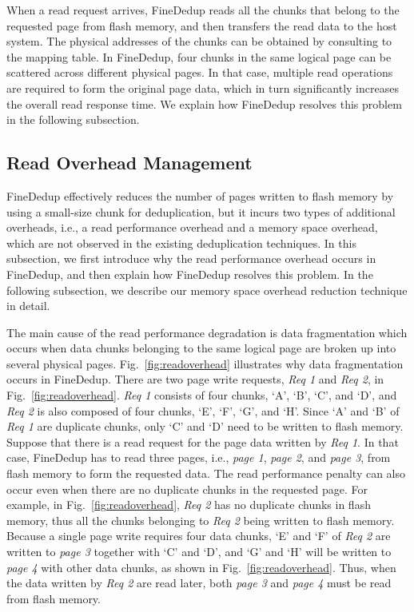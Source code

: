 When a read request arrives,
FineDedup reads all the chunks that belong to the requested page from flash memory,
and then transfers the read data to the host system.
The physical addresses of the chunks can be obtained by consulting to the mapping table.
In FineDedup, four chunks in the same logical page can be scattered across different physical pages.
In that case, multiple read operations are required to form the original page data,
which in turn significantly increases the overall read response time.
We explain how FineDedup resolves this problem in the following subsection.

\subsection{Read Overhead Management}
\label{sec:finededup_readoverheadmanagement}

FineDedup effectively reduces the number of pages written to flash memory
by using a small-size chunk for deduplication,
but it incurs two types of additional overheads, i.e.,
a read performance overhead and a memory space overhead,
which are not observed in the existing deduplication techniques.
In this subsection, 
we first introduce why the read performance overhead occurs in FineDedup,
and then explain how FineDedup resolves this problem.
In the following subsection, 
we describe our memory space overhead reduction technique in detail.

The main cause of the read performance degradation is data fragmentation
which occurs when data chunks belonging to the same logical page are broken up into several physical pages.
Fig.~\ref{fig:readoverhead} illustrates why data fragmentation occurs in FineDedup.
There are two page write requests, \textit{Req 1} and \textit{Req 2}, in Fig.~\ref{fig:readoverhead}.
\textit{Req 1} consists of four chunks, `A', `B', `C', and `D', 
and \textit{Req 2} is also composed of four chunks, `E', `F', `G', and `H'.
Since `A' and `B' of \textit{Req 1} are duplicate chunks,
only `C' and `D' need to be written to flash memory.
Suppose that there is a read request for the page data written by \textit{Req 1}.
In that case, FineDedup has to read three pages, i.e., \textit{page 1}, \textit{page 2}, and \textit{page 3}, from flash memory
to form the requested data.
The read performance penalty can also occur even when there are no duplicate chunks in the requested page.
For example, in Fig.~\ref{fig:readoverhead}, 
\textit{Req 2} has no duplicate chunks in flash memory,
thus all the chunks belonging to \textit{Req 2} being written to flash memory.
Because a single page write requires four data chunks, 
`E' and `F' of \textit{Req 2} are written to \textit{page 3} together with `C' and `D',
and `G' and `H' will be written to \textit{page 4} with other data chunks, as shown in Fig.~\ref{fig:readoverhead}.
Thus, when the data written by \textit{Req 2} are read later, 
both \textit{page 3} and \textit{page 4} must be read from flash memory.

